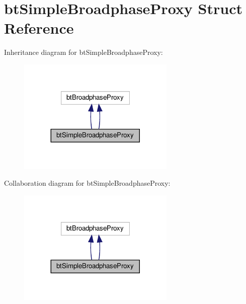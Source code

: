 \hypertarget{structbtSimpleBroadphaseProxy}{}\section{bt\+Simple\+Broadphase\+Proxy Struct Reference}
\label{structbtSimpleBroadphaseProxy}


Inheritance diagram for bt\+Simple\+Broadphase\+Proxy\+:
\nopagebreak
\begin{figure}[H]
\begin{center}
\leavevmode
\includegraphics[width=212pt]{structbtSimpleBroadphaseProxy__inherit__graph}
\end{center}
\end{figure}


Collaboration diagram for bt\+Simple\+Broadphase\+Proxy\+:
\nopagebreak
\begin{figure}[H]
\begin{center}
\leavevmode
\includegraphics[width=212pt]{structbtSimpleBroadphaseProxy__coll__graph}
\end{center}
\end{figure}
